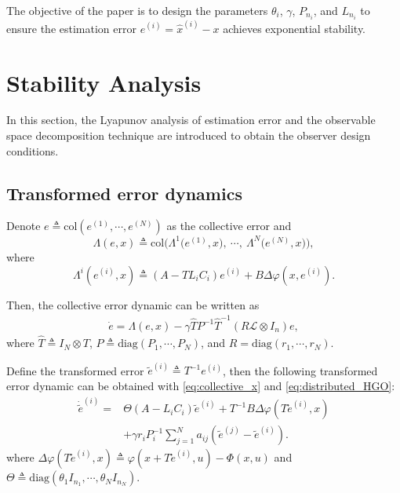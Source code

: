 \documentclass{ifacconf}
\begin{document}
The objective of the paper is to design the parameters $\theta_i$, $\gamma$, $P_{n_i}$, and $L_{n_i}$ to ensure the estimation error $e^{(i)}=\hat{x}^{(i)}-x$ achieves exponential stability.














\section{Stability Analysis}\label{sec:stability}
\vspace*{-0.3 cm}

In this section, the Lyapunov analysis of estimation error and the observable space decomposition technique are introduced to obtain the observer design conditions.

\subsection{Transformed error dynamics}
\vspace*{-0.3 cm}
Denote $e \triangleq \mathrm{col} (e^{(1)},\cdots , e^{(N)})$ as the collective error and 
\[\Lambda(e,x)\triangleq\mathrm{col}\Big(\Lambda^1\big(e^{(1)},x\big),\ \cdots,\ \Lambda^N\big(e^{(N)},x\big)\Big),\]
where
\[\Lambda^i(e^{(i)},x)\triangleq\left(A-TL_iC_i\right)e^{(i)}+B\Delta\varphi(x,e^{(i)}).\]

Then, the collective error dynamic can be written as
\begin{equation}
    \begin{aligned}
        \dot{e}=\Lambda (e,x)-\gamma \hat{T}P^{-1}\hat{T}^{-1}(R\mathcal{L}\otimes I_{n})e,
    \end{aligned}
\end{equation}
where $\hat{T}\triangleq I_N\otimes T$, $P\triangleq\mathrm{diag}(P_1,\cdots,P_N)$, and $R=\mathrm{diag}(r_1,\cdots,r_N)$.

Define the transformed error $\tilde{e}^{(i)}\triangleq T^{-1}e^{(i)}$, then the following transformed error dynamic can be obtained with \eqref{eq:collective_x} and \eqref{eq:distributed_HGO}:
\begin{equation}
    \begin{aligned}
        \dot{\tilde{e}}^{(i)}=&\Theta(A-L_iC_i)\tilde{e}^{(i)}+T^{-1}B\Delta\varphi(T\tilde{e}^{(i)},x)\\
        &+\gamma r_i P_i^{-1}\sum^N_{j=1}a_{ij}(\tilde{e}^{(j)}-\tilde{e}^{(i)}).
    \end{aligned}\label{eq:transformed_error_dynamic}
\end{equation}
where $\Delta\varphi(T\tilde{e}^{(i)},x) \triangleq \varphi(x + T\tilde{e}^{(i)},u) - \Phi(x,u)$ and $\Theta \triangleq \mathrm{diag}(\theta_1I_{n_1},\cdots,\theta_{N}I_{n_N})$.
\end{document}
